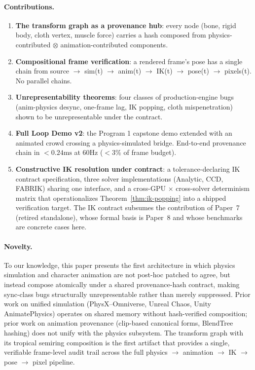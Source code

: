 \documentclass[sigconf,nonacm]{acmart}
\newcommand{\tropmult}{\otimes}
\begin{document}
\paragraph{Contributions.}
\begin{enumerate}
  \item \textbf{The transform graph as a provenance hub}: every node
    (bone, rigid body, cloth vertex, muscle force) carries a hash
    composed from physics-contributed $\tropmult$ animation-contributed
    components.
  \item \textbf{Compositional frame verification}: a rendered frame's
    pose has a single chain from source $\to$ sim(t) $\to$ anim(t)
    $\to$ IK(t) $\to$ pose(t) $\to$ pixels(t). No parallel chains.
  \item \textbf{Unrepresentability theorems}: four classes of
    production-engine bugs (anim-physics desync, one-frame lag,
    IK popping, cloth mispenetration) shown to be unrepresentable
    under the contract.
  \item \textbf{Full Loop Demo v2}: the Program 1 capstone demo
    extended with an animated crowd crossing a physics-simulated
    bridge. End-to-end provenance chain in $<0.24\text{ms}$ at 60Hz
    ($<3\%$ of frame budget).
  \item \textbf{Constructive IK resolution under contract}: a
    tolerance-declaring IK contract specification, three solver
    implementations (Analytic, CCD, FABRIK) sharing one interface,
    and a cross-GPU $\times$ cross-solver determinism matrix that
    operationalizes Theorem~\ref{thm:ik-popping} into a shipped
    verification target. The IK contract subsumes the contribution
    of Paper~7 (retired standalone), whose formal basis is Paper~8
    and whose benchmarks are concrete cases here.
\end{enumerate}

\paragraph{Novelty.}
To our knowledge, this paper presents the first architecture in
which physics simulation and character animation are not post-hoc
patched to agree, but instead compose atomically under a shared
provenance-hash contract, making sync-class bugs structurally
unrepresentable rather than merely suppressed. Prior work on
unified simulation (PhysX--Omniverse, Unreal Chaos, Unity
AnimatePhysics) operates on shared memory without hash-verified
composition; prior work on animation provenance (clip-based
canonical forms, BlendTree hashing) does not unify with the
physics subsystem. The transform graph with its tropical semiring
composition is the first artifact that provides a single,
verifiable frame-level audit trail across the full
physics $\to$ animation $\to$ IK $\to$ pose $\to$ pixel pipeline.
\end{document}
